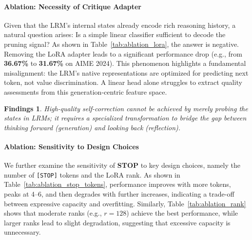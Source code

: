 \documentclass[11pt]{article}
\theoremstyle{plain}
\newtheorem{findings}{Findings}
\begin{document}
\paragraph{Ablation: Necessity of Critique Adapter}
Given that the LRM's internal states already encode rich reasoning history, a natural question arises: Is a simple linear classifier sufficient to decode the pruning signal?
As shown in Table~\ref{tab:ablation_lora}, the answer is negative. Removing the LoRA adapter leads to a significant performance drop (e.g., from \textbf{36.67\%} to \textbf{31.67\%} on AIME 2024).
This phenomenon highlights a fundamental misalignment: the LRM's native representations are optimized for predicting next token, not value discrimination.
A linear head alone struggles to extract quality assessments from this generation-centric feature space.

\begin{table}[ht]
\centering
\caption{Comparing the STOP module with a simple linear classifier confirms that raw internal states require adaptation to perform effective self-evaluation.}
\label{tab:ablation_lora}
\vspace{-4mm}
\end{table}

\begin{findings}
High-quality self-correction cannot be achieved by merely probing the states in LRMs; it requires a specialized transformation to bridge the gap between thinking forward (generation) and looking back (reflection).
\end{findings}

\paragraph{Ablation: Sensitivity to Design Choices}
We further examine the sensitivity of \textbf{STOP} to key design choices, namely the number of \texttt{[STOP]} tokens and the LoRA rank. As shown in Table~\ref{tab:ablation_stop_tokens}, performance improves with more tokens, peaks at 4--6, and then degrades with further increases, indicating a trade-off between expressive capacity and overfitting. Similarly, Table~\ref{tab:ablation_rank} shows that moderate ranks (e.g., $r=128$) achieve the best performance, while larger ranks lead to slight degradation, suggesting that excessive capacity is unnecessary.
\end{document}
